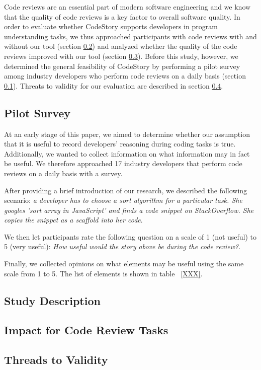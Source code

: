 \documentclass[../manifest.tex]{subfiles}
\begin{document}
Code reviews are an essential part of modern software engineering and we know that the quality of code reviews is a key factor to overall software quality. In order to evaluate whether CodeStory supports developers in program understanding tasks, we thus approached participants with code reviews with and without our tool (section \ref{eval-description}) and analyzed whether the quality of the code reviews improved with our tool (section \ref{eval-impact}). Before this study, however, we determined the general feasibility of CodeStory by performing a pilot survey among industry developers who perform code reviews on a daily basis (section \ref{eval-survey}). Threats to validity for our evaluation are described in section \ref{eval-threats}.

\subsection{Pilot Survey} \label{eval-survey}

At an early stage of this paper, we aimed to determine whether our assumption that it is useful to record developers' reasoning during coding tasks is true. Additionally, we wanted to collect information on what information may in fact be useful. We therefore approached 17 industry developers that perform code reviews on a daily basis with a survey. 

After providing a brief introduction of our research, we described the following scenario: \textit{a developer has to choose a sort algorithm for a particular task. She googles 'sort array in JavaScript' and finds a code snippet on StackOverflow. She copies the snippet as a scaffold into her code}.

We then let participants rate the following question on a scale of 1 (not useful) to 5 (very useful): \textit{How useful would the story above be during the code review?}.

Finally, we collected opinions on what elements may be useful using the same scale from 1 to 5. The list of elements is shown in table ~\ref{XXX}.

\subsection{Study Description} \label{eval-description}

\subsection{Impact for Code Review Tasks} \label{eval-impact}

\subsection{Threads to Validity} \label{eval-threats}
\end{document}
